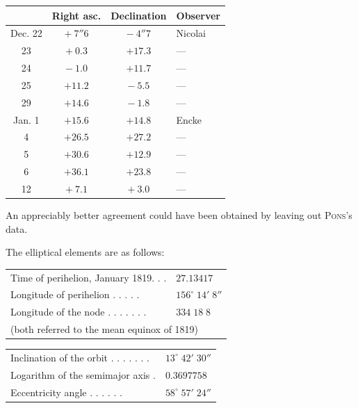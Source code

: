 \begin{center}
\begin{tabular}{c|c|c|l}
& Right asc. & Declination & Observer \\
\hline
Dec. 22 & $+\ 7''6$  & $-\ 4''7$  & Nicolai \\
     23 & $+\ 0.3$   & $+17.3$    & --- \\
     24 & $-\ 1.0$   & $+11.7$    & --- \\
     25 & $+11.2$    & $-\ 5.5$   & --- \\
     29 & $+14.6$    & $-\ 1.8$   & --- \\
Jan.  1 & $+15.6$    & $+14.8$    & Encke \\
      4 & $+26.5$    & $+27.2$    & --- \\
      5 & $+30.6$    & $+12.9$    & --- \\
      6 & $+36.1$    & $+23.8$    & --- \\
     12 & $+\ 7.1$   & $+\ 3.0$   & --- \\
\end{tabular}
\end{center}

\par\indent An appreciably better agreement could have been obtained by leaving out \textsc{Pons}’s data.

\par\indent The elliptical elements are as follows:

\begin{center}
\begin{tabular}{ll}
Time of perihelion, January 1819. . . & $27.13417$\footnotemark \\
Longitude of perihelion . . . . . & $156^\circ\;14'\;8''$ \\
Longitude of the node . . . . . . . & $334\;18\;8$ \\
\multicolumn{2}{l}{(both referred to the mean equinox of 1819)} \\
\end{tabular}\par\smallskip
\begin{tabular}{ll}
Inclination of the orbit . . . . . . . & $13^\circ\;42'\;30''$ \\
Logarithm of the semimajor axis . & $0.3697758$ \\
Eccentricity angle . . . . . . & $58^\circ\;57'\;24''$ \\
\end{tabular}
\end{center}

